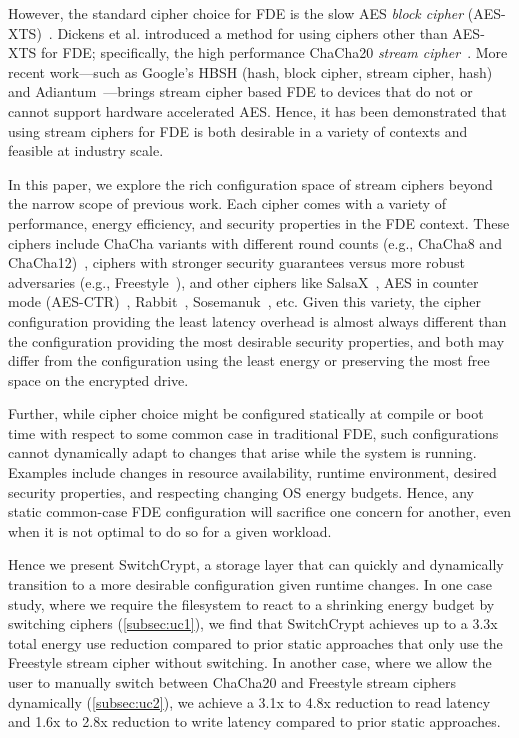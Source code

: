 However, the standard cipher choice for FDE is the slow AES \emph{block cipher}
(AES-XTS)~\cite{XTS, XTSComments, NISTXTS}. Dickens et al. introduced a method
for using ciphers other than AES-XTS for FDE; specifically, the high performance
ChaCha20 \emph{stream cipher}~\cite{StrongBox, ChaCha20}. More recent
work---such as Google's HBSH (hash, block cipher, stream cipher, hash) and
Adiantum~\cite{Adiantum}---brings stream cipher based FDE to devices that do not
or cannot support hardware accelerated AES. Hence, it has been demonstrated that
using stream ciphers for FDE is both desirable in a variety of contexts and
feasible at industry scale.

In this paper, we explore the rich configuration space of stream
ciphers beyond the narrow scope of previous work. Each cipher comes
with a variety of performance, energy efficiency, and security
properties in the FDE context.  These ciphers include ChaCha variants
with different round counts (e.g., ChaCha8 and
ChaCha12)~\cite{ChaCha20}, ciphers with stronger security guarantees
versus more robust adversaries (e.g., Freestyle~\cite{Freestyle}), and
other ciphers like SalsaX~\cite{SalsaX}, AES in counter mode
(AES-CTR)~\cite{AESCTR}, Rabbit~\cite{Rabbit},
Sosemanuk~\cite{Sosemanuk}, etc.  Given this variety, the cipher
configuration providing the least latency overhead is almost always
different than the configuration providing the most desirable security
properties, and both may differ from the configuration using the least
energy or preserving the most free space on the encrypted drive.

Further, while cipher choice might be configured statically at compile or boot
time with respect to some common case in traditional FDE, such configurations
cannot dynamically adapt to changes that arise while the system is running.
Examples include changes in resource availability, runtime environment, desired
security properties, and respecting changing OS energy budgets. Hence, any
static common-case FDE configuration will sacrifice one concern for another,
even when it is not optimal to do so for a given workload.

Hence we present SwitchCrypt, a storage layer that can quickly and dynamically
transition to a more desirable configuration given runtime changes. In one case
study, where we require the filesystem to react to a shrinking energy budget by
switching ciphers (\cref{subsec:uc1}), we find that SwitchCrypt achieves up to a
3.3x total energy use reduction compared to prior static approaches that only
use the Freestyle stream cipher without switching. In another case, where we
allow the user to manually switch between ChaCha20 and Freestyle stream ciphers
dynamically (\cref{subsec:uc2}), we achieve a 3.1x to 4.8x reduction to read
latency and 1.6x to 2.8x reduction to write latency compared to prior static
approaches.


